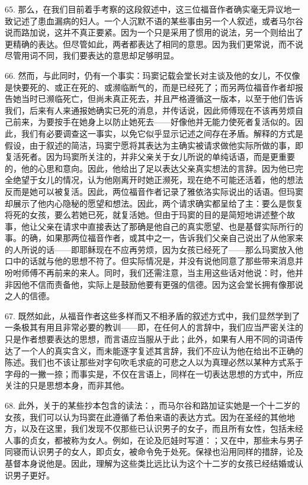 65. 那么，在我们目前着手考察的这段叙述中，这三位福音作者确实毫无异议地一致记述了患血漏病的妇人。一个人沉默不语的某些事由另一个人叙述，或者马尔谷说而路加说，这并不真正要紧。因为一个只是采用了惯用的说法，另一个则给出了更精确的表达。但尽管如此，两者都表达了相同的意思。因为我们更常说，而不说尽管用词不同，我们要表达的意思却足够明显。\par

66. 然而，与此同时，仍有一个事实：玛窦记载会堂长对主谈及他的女儿，不仅像是快要死的、或正在死的、或濒临断气的，而是已经死了；而另两位福音作者却报告她当时已濒临死亡，但尚未真正死去，并且严格遵循这一版本，以至于他们告诉我们，后来有人来通报她确实已死的消息，并传话说，因此师傅现在不该再劳烦自己前来，为要按手在她身上以防止她死去——好像他并无能力使死者复活似的。因此，我们有必要调查这一事实，以免它似乎显示记述之间存在矛盾。解释的方式是假设，由于叙述的简洁，玛窦宁愿将其表达为主确实被请求做他实际所做的事，即复活死者。因为玛窦所关注的，并非父亲关于女儿所说的单纯话语，而是更重要的，他的心思和意向。因此，他给出了足以表达父亲真实想法的言辞。因为他已完全绝望于女儿的情况，认为他刚离开时她正濒死，现在绝不可能还活着，他的想法反而是她可以被复活。因此，两位福音作者记录了雅依洛实际说出的话语。但玛窦却展示了他内心隐秘的愿望和想法。因此，两个请求确实都呈给了主：要么是恢复将死的女孩，要么若她已死，就复活她。但由于玛窦的目的是简短地讲述整个故事，他让父亲在请求中直接表达了那确是他自己的真实愿望、也是基督实际所行的事。的确，如果那两位福音作者，或其中之一，告诉我们父亲自己说出了从他家来的人所说的话——即耶稣现在不应再劳烦，因为女孩已经死了——那么玛窦放入他口中的话就与他的思想不符了。但实际情况是，并没有说他同意了那些带来消息并吩咐师傅不再前来的来人。同时，我们还需注意，当主用这些话对他说：时，他并非因他不信而责备他，实际上是鼓励他要有更强的信德。因为这会堂长拥有像那说之人的信德。\par

67. 既然如此，从福音作者这些多样而又不相矛盾的叙述方式中，我们显然学到了一条极其有用且非常必要的教训——即，在任何人的言辞中，我们应当严密关注的只是作者想要表达的思想，而言语应当服从于此；此外，如果有人用不同的词语传达了一个人的真实含义，而未能逐字复述其言辞，我们不应认为他在给出不正确的陈述。我们也不该让那些对字句吹毛求疵的可悲之人以为真理必然以某种方式系于字母的一撇一捺；而事实是，不仅在言语上，同样在一切表达思想的方式中，所应关注的只是思想本身，而非其他。\par

68. 此外，关于的某些抄本包含的读法：，而马尔谷和路加证实她是一个十二岁的女孩，我们可以认为玛窦在此遵循了希伯来语的表达方式。因为在圣经的其他地方，以及在这里，我们发现不仅那些已认识男子的女子，而且所有女性，包括未经人事的贞女，都被称为女人。例如，在论及厄娃时写道：；又在中，那些未与男子同寝而认识男子的女人，即贞女，被命令免于处死。保禄也沿用同样的措辞，论及基督本身说他是。因此，理解为这些类比远比认为这个十二岁的女孩已经结婚或认识男子更好。\par

